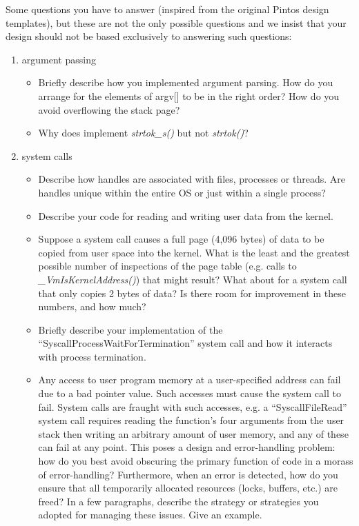 Some questions you have to answer (inspired from the original Pintos design templates), but these are not the only possible questions and we insist that your design should not be based exclusively to answering such questions:
\begin{enumerate}
    \item argument passing
        \begin{itemize}
            \item Briefly describe how you implemented argument parsing.  How do you arrange for the elements of argv[] to be in the right order? How do you avoid overflowing the stack page?
            
            \item Why does \OSName{} implement \textit{strtok\_s()} but not \textit{strtok()}?
            
        \end{itemize}

        \item system calls
            \begin{itemize}
                \item Describe how handles are associated with files, processes or threads. Are handles unique within the entire OS or just within a single process?
                
                \item Describe your code for reading and writing user data from the kernel.
                
                \item Suppose a system call causes a full page (4,096 bytes) of data to be copied from user space into the kernel. What is the least and the greatest possible number of inspections of the page table (e.g. calls to \textit{\_VmIsKernelAddress()}) that might result? What about for a system call that only copies 2 bytes of data? Is there room for improvement in these numbers, and how much?
                
                \item Briefly describe your implementation of the ``SyscallProcessWaitForTermination'' system call and how it interacts with process termination.
                
                \item Any access to user program memory at a user-specified address can fail due to a bad pointer value.  Such accesses must cause the system call to fail.  System calls are fraught with such accesses, e.g. a ``SyscallFileRead'' system call requires reading the function's four arguments from the user stack then writing an arbitrary amount of user memory, and any of these can fail at any point.  This poses a design and error-handling problem: how do you best avoid obscuring the primary function of code in a morass of error-handling?  Furthermore, when an error is detected, how do you ensure that all temporarily allocated resources (locks, buffers, etc.) are freed?  In a few paragraphs, describe the strategy or strategies you adopted for managing these issues. Give an example.
                

\end{itemize}
\end{enumerate}
